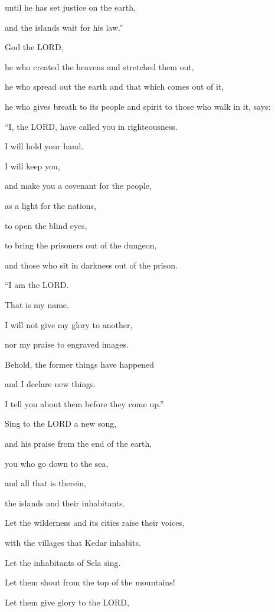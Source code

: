 until he has set justice on the earth,

and the islands wait for his law.”


\vspace{\baselineskip} \myverse{}God the LORD,

he who created the heavens and stretched them out,

he who spread out the earth and that which comes out of it,

he who gives breath to its people and spirit to those who walk in it, says:

\myverse{}“I, the LORD, have called you in righteousness.

I will hold your hand.

I will keep you,

and make you a covenant for the people,

as a light for the nations,

\myverse{}to open the blind eyes,

to bring the prisoners out of the dungeon,

and those who sit in darkness out of the prison.


\vspace{\baselineskip} \myverse{}“I am the LORD.

That is my name.

I will not give my glory to another,

nor my praise to engraved images.

\myverse{}Behold, the former things have happened

and I declare new things.

I tell you about them before they come up.”


\vspace{\baselineskip} \myverse{}Sing to the LORD a new song,

and his praise from the end of the earth,

you who go down to the sea,

and all that is therein,

the islands and their inhabitants.

\myverse{}Let the wilderness and its cities raise their voices,

with the villages that Kedar inhabits.

Let the inhabitants of Sela sing.

Let them shout from the top of the mountains!

\myverse{}Let them give glory to the LORD,

